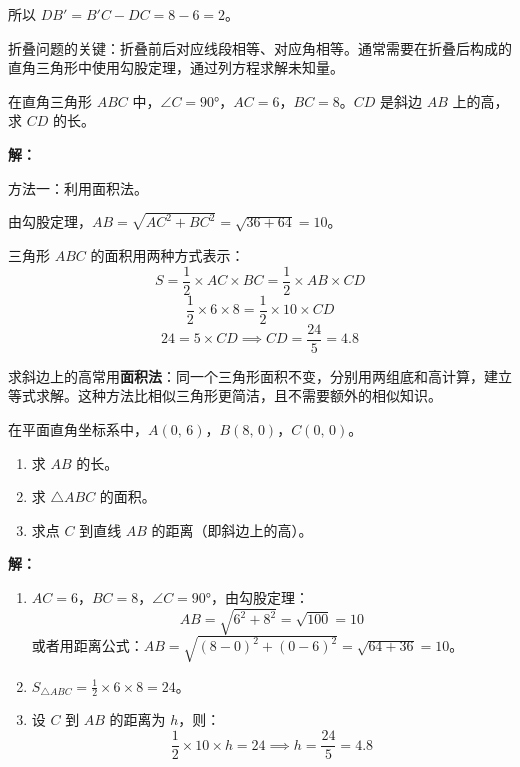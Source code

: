 \documentclass[12pt, a4paper]{ctexart}
\begin{document}
所以 $DB' = B'C - DC = 8 - 6 = 2$。

\begin{tipbox}[方法总结]
折叠问题的关键：折叠前后对应线段相等、对应角相等。通常需要在折叠后构成的直角三角形中使用勾股定理，通过列方程求解未知量。
\end{tipbox}

\vspace{6pt}

\begin{examplebox}
在直角三角形 $ABC$ 中，$\angle C = 90°$，$AC = 6$，$BC = 8$。$CD$ 是斜边 $AB$ 上的高，求 $CD$ 的长。
\end{examplebox}

\textbf{解：}

方法一：利用面积法。

由勾股定理，$AB = \sqrt{AC^2 + BC^2} = \sqrt{36 + 64} = 10$。

三角形 $ABC$ 的面积用两种方式表示：
\[
S = \frac{1}{2} \times AC \times BC = \frac{1}{2} \times AB \times CD
\]
\[
\frac{1}{2} \times 6 \times 8 = \frac{1}{2} \times 10 \times CD
\]
\[
24 = 5 \times CD \implies CD = \frac{24}{5} = 4.8
\]

\begin{tipbox}[方法总结]
求斜边上的高常用\textbf{面积法}：同一个三角形面积不变，分别用两组底和高计算，建立等式求解。这种方法比相似三角形更简洁，且不需要额外的相似知识。
\end{tipbox}

\vspace{6pt}

\begin{examplebox}
在平面直角坐标系中，$A(0,\, 6)$，$B(8,\, 0)$，$C(0,\, 0)$。
\begin{enumerate}[label=(\arabic*)]
  \item 求 $AB$ 的长。
  \item 求 $\triangle ABC$ 的面积。
  \item 求点 $C$ 到直线 $AB$ 的距离（即斜边上的高）。
\end{enumerate}
\end{examplebox}

\textbf{解：}
\begin{enumerate}[label=(\arabic*)]
  \item $AC = 6$，$BC = 8$，$\angle C = 90°$，由勾股定理：
  \[
  AB = \sqrt{6^2 + 8^2} = \sqrt{100} = 10
  \]
  或者用距离公式：$AB = \sqrt{(8-0)^2+(0-6)^2} = \sqrt{64+36} = 10$。

  \item $S_{\triangle ABC} = \frac{1}{2} \times 6 \times 8 = 24$。

  \item 设 $C$ 到 $AB$ 的距离为 $h$，则：
  \[
  \frac{1}{2} \times 10 \times h = 24 \implies h = \frac{24}{5} = 4.8
  \]
\end{enumerate}
\end{document}
